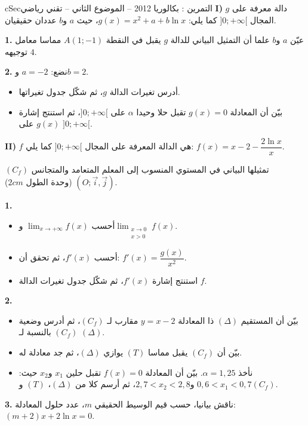 \documentclass[12pt,a4paper]{article}
\newenvironment{BOX}[2]{\begin{otherlanguage}{english}\begin{arbox}{#1}{#2}}{\end{arbox}\end{otherlanguage}}
\newcounter{exo}
\newenvironment{tamrin}[1]{\stepcounter{exo}\begin{BOX}{cSec}{التمرين \theexo: #1}}{\end{BOX}}
\newenvironment{sq}{\begin{itemize}[leftmargin=2.4em,itemsep=3pt]}{\end{itemize}}
\newcommand{\qa}{\item[(أ)]}\newcommand{\qb}{\item[(ب)]}\newcommand{\qc}{\item[(جـ)]}\newcommand{\qd}{\item[(د)]}\newcommand{\qe}{\item[(هـ)]}
\newcommand{\QQ}[1]{\par\smallskip\textbf{#1.} }
\begin{document}
\begin{tamrin}{بكالوريا 2012 -- الموضوع الثاني -- تقني رياضي}
\textbf{I)} $g$ دالة معرفة على المجال $]0;+\infty[$ كما يلي: $g(x)=x^2+a+b\ln x$، حيث $a$ و$b$ عددان حقيقيان.
\QQ{1} عيّن $a$ و$b$ علما أن التمثيل البياني للدالة $g$ يقبل في النقطة $A(1;-1)$ مماسا معامل توجيهه $4$.
\QQ{2} نضع: $a=-2$ و$b=2$.
\begin{sq}
\qa أدرس تغيرات الدالة $g$، ثم شكّل جدول تغيراتها.
\qb بيّن أن المعادلة $g(x)=0$ تقبل حلا وحيدا $\alpha$ على $]0;+\infty[$، ثم استنتج إشارة $g(x)$ على $]0;+\infty[$.
\end{sq}

\textbf{II)} $f$ هي الدالة المعرفة على المجال $]0;+\infty[$ كما يلي: $f(x)=x-2-\dfrac{2\ln x}{x}$.

$(C_f)$ تمثيلها البياني في المستوي المنسوب إلى المعلم المتعامد والمتجانس $(O;\vec{i},\vec{j})$ (وحدة الطول $2cm$).
\QQ{1}
\begin{sq}
\qa أحسب $\displaystyle\lim_{x\to+\infty}f(x)$ و$\displaystyle\lim_{\substack{x\to0\\x>0}}f(x)$.
\qb أحسب $f'(x)$، ثم تحقق أن: $f'(x)=\dfrac{g(x)}{x^2}$.
\qc استنتج إشارة $f'(x)$، ثم شكّل جدول تغيرات الدالة $f$.
\end{sq}
\QQ{2}
\begin{sq}
\qa بيّن أن المستقيم $(\Delta)$ ذا المعادلة $y=x-2$ مقارب لـ $(C_f)$، ثم أدرس وضعية $(C_f)$ بالنسبة لـ $(\Delta)$.
\qb بيّن أن $(C_f)$ يقبل مماسا $(T)$ يوازي $(\Delta)$، ثم جد معادلة له.
\qc نأخذ $\alpha=1{,}25$. بيّن أن المعادلة $f(x)=0$ تقبل حلين $x_1$ و$x_2$ حيث: $0{,}6<x_1<0{,}7$ و$2{,}7<x_2<2{,}8$، ثم أرسم كلا من $(\Delta)$، $(T)$ و$(C_f)$.
\end{sq}
\QQ{3} ناقش بيانيا، حسب قيم الوسيط الحقيقي $m$، عدد حلول المعادلة: $(m+2)x+2\ln x=0$.
\end{tamrin}
\end{document}
